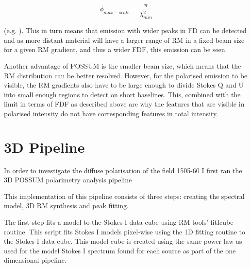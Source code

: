 \begin{equation}
    \phi_{max-scale} = \frac{\pi}{\lambda_{min}^2}
\end{equation}

(e.g. \cite{Sun_2015}). This in turn means that emission with wider peaks in FD can be detected and as more distant material will have a larger range of RM in a fixed beam size for a given RM gradient, and thus a wider FDF, this emission can be seen.

Another advantage of POSSUM is the smaller beam size, which means that the RM distribution can be better resolved. However, for the polarised emission to be visible, the RM gradients also have to be large enough to divide Stokes Q and U into small enough regions to detect on short baselines. This, combined with the limit in terms of FDF as described above are why the features that are visible in polarised intensity do not have corresponding features in total intensity.








\section{3D Pipeline}
\label{3d pipeline}

In order to investigate the diffuse polarisation of the field 1505-60 I first ran the 3D POSSUM polarimetry analysis pipeline

This implementation of this pipeline consists of three steps: creating the spectral model, 3D RM synthesis and peak fitting.

The first step fits a model to the Stokes I data cube using RM-tools' fitIcube routine. This script fits Stokes I models pixel-wise using the 1D fitting routine to the Stokes I data cube. This model cube is created using the same power law as used for the model Stokes I spectrum found for each source as part of the one dimensional pipeline.

